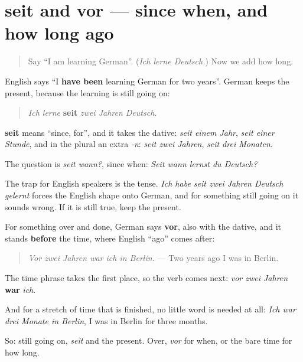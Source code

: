 \section[seit, vor]{seit and vor — since when, and how long ago}

\label{lesson:GE-C259-seit}



\begin{quote}
Say \textquotedblleft{}I am learning German\textquotedblright{}. (\emph{Ich lerne Deutsch.}) Now we add how long.
\end{quote}

\begin{grammarlens}[title={Grammar Lens: seit, with the present}]
English says \textquotedblleft{}I \textbf{have been} learning German for two years\textquotedblright{}. German keeps the present, because the learning is still going on:

\begin{quote}
\emph{Ich lerne} \textbf{seit} \emph{zwei Jahren Deutsch.}
\end{quote}

\textbf{seit} means \textquotedblleft{}since, for\textquotedblright{}, and it takes the dative: \emph{seit einem Jahr}, \emph{seit einer Stunde}, and in the plural an extra \emph{-n}: \emph{seit zwei Jahren}, \emph{seit drei Monaten}.

The question is \emph{seit wann?}, since when: \emph{Seit wann lernst du Deutsch?}

The trap for English speakers is the tense. \emph{Ich habe seit zwei Jahren Deutsch gelernt} forces the English shape onto German, and for something still going on it sounds wrong. If it is still true, keep the present.
\end{grammarlens}

\begin{culture}
For something over and done, German says \textbf{vor}, also with the dative, and it stands \textbf{before} the time, where English \textquotedblleft{}ago\textquotedblright{} comes after:

\begin{quote}
\emph{Vor zwei Jahren war ich in Berlin.} — Two years ago I was in Berlin.
\end{quote}

The time phrase takes the first place, so the verb comes next: \emph{vor zwei Jahren} \textbf{war} \emph{ich}.

And for a stretch of time that is finished, no little word is needed at all: \emph{Ich war drei Monate in Berlin}, I was in Berlin for three months.

So: still going on, \emph{seit} and the present. Over, \emph{vor} for when, or the bare time for how long.
\end{culture}

